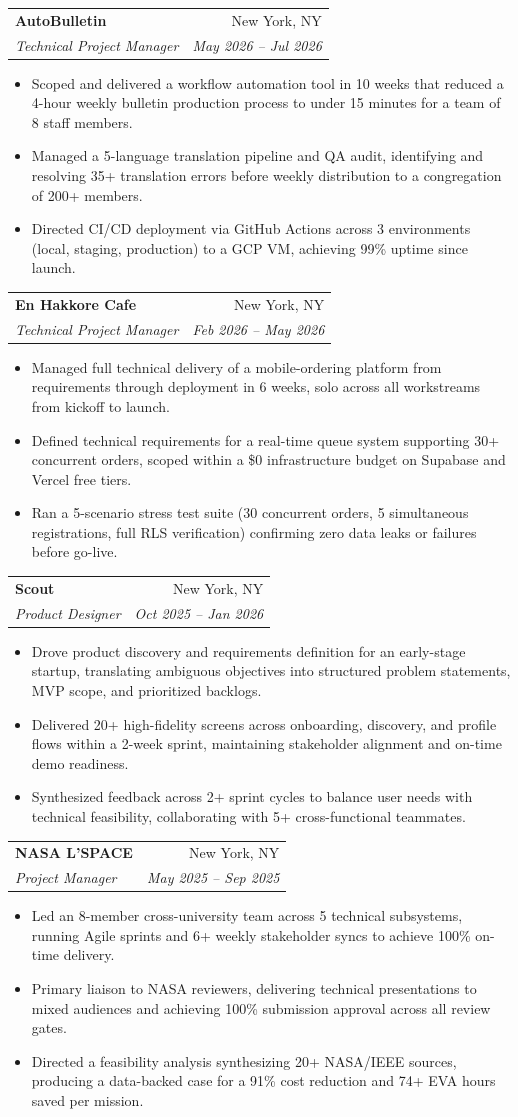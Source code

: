 \documentclass[letterpaper,10pt]{article}
\makeatletter
\newcommand{\resumeItem}[1]{\item\small{{#1 \vspace{-1pt}}}}
\newcommand{\resumeSubheading}[4]{
  \vspace{-2pt}\item
    \begin{tabular*}{0.97\textwidth}[t]{l@{\extracolsep{\fill}}r}
      \textbf{#1} & #2 \\
      \textit{\small#3} & \textit{\small #4} \\
    \end{tabular*}\vspace{-6pt}
}
\newcommand{\resumeItemListStart}{\begin{itemize}}
\newcommand{\resumeItemListEnd}{\end{itemize}\vspace{-4pt}}
\makeatother
\begin{document}
    \resumeSubheading
      {AutoBulletin}{New York, NY}
      {Technical Project Manager}{May 2026 -- Jul 2026}
      \resumeItemListStart
        \resumeItem{Scoped and delivered a workflow automation tool in 10 weeks that reduced a 4-hour weekly bulletin production process to under 15 minutes for a team of 8 staff members.}
        \resumeItem{Managed a 5-language translation pipeline and QA audit, identifying and resolving 35+ translation errors before weekly distribution to a congregation of 200+ members.}
        \resumeItem{Directed CI/CD deployment via GitHub Actions across 3 environments (local, staging, production) to a GCP VM, achieving 99\% uptime since launch.}
      \resumeItemListEnd

    \resumeSubheading
      {En Hakkore Cafe}{New York, NY}
      {Technical Project Manager}{Feb 2026 -- May 2026}
      \resumeItemListStart
        \resumeItem{Managed full technical delivery of a mobile-ordering platform from requirements through deployment in 6 weeks, solo across all workstreams from kickoff to launch.}
        \resumeItem{Defined technical requirements for a real-time queue system supporting 30+ concurrent orders, scoped within a \$0 infrastructure budget on Supabase and Vercel free tiers.}
        \resumeItem{Ran a 5-scenario stress test suite (30 concurrent orders, 5 simultaneous registrations, full RLS verification) confirming zero data leaks or failures before go-live.}
      \resumeItemListEnd

    \resumeSubheading
      {Scout}{New York, NY}
      {Product Designer}{Oct 2025 -- Jan 2026}
      \resumeItemListStart
        \resumeItem{Drove product discovery and requirements definition for an early-stage startup, translating ambiguous objectives into structured problem statements, MVP scope, and prioritized backlogs.}
        \resumeItem{Delivered 20+ high-fidelity screens across onboarding, discovery, and profile flows within a 2-week sprint, maintaining stakeholder alignment and on-time demo readiness.}
        \resumeItem{Synthesized feedback across 2+ sprint cycles to balance user needs with technical feasibility, collaborating with 5+ cross-functional teammates.}
      \resumeItemListEnd

    \resumeSubheading
      {NASA L'SPACE}{New York, NY}
      {Project Manager}{May 2025 -- Sep 2025}
      \resumeItemListStart
        \resumeItem{Led an 8-member cross-university team across 5 technical subsystems, running Agile sprints and 6+ weekly stakeholder syncs to achieve 100\% on-time delivery.}
        \resumeItem{Primary liaison to NASA reviewers, delivering technical presentations to mixed audiences and achieving 100\% submission approval across all review gates.}
        \resumeItem{Directed a feasibility analysis synthesizing 20+ NASA/IEEE sources, producing a data-backed case for a 91\% cost reduction and 74+ EVA hours saved per mission.}
      \resumeItemListEnd
\end{document}
